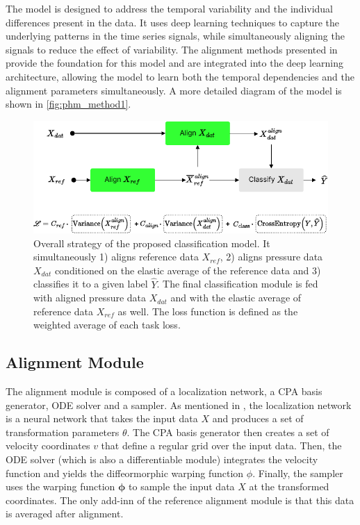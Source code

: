 The model is designed to address the temporal variability and the individual differences present in the data. It uses deep learning techniques to capture the underlying patterns in the time series signals, while simultaneously aligning the signals to reduce the effect of variability. The alignment methods presented in \cite{martinez2022closed} provide the foundation for this model and are integrated into the deep learning architecture, allowing the model to learn both the temporal dependencies and the alignment parameters simultaneously.
%
%
A more detailed diagram of the model is shown in \cref{fig:phm_method1}.
\begin{figure}[!htb]
    \begin{center}
    \centerline{\includegraphics[width=\linewidth]{figures/phm4.pdf}}
    \caption{Overall strategy of the proposed classification model. It simultaneously 1) aligns reference data $X_{ref}$, 2) aligns pressure data $X_{dat}$ conditioned on the elastic average of the reference data and 3) classifies it to a given label $\hat{Y}$. 
    The final classification module is fed with aligned pressure data $X_{dat}$ and with the elastic average of reference data $X_{ref}$ as well.
    The loss function is defined as the weighted average of each task loss.}
    \label{fig:phm_method2}
    \end{center}
\end{figure}



\subsection{Alignment Module}
The alignment module is composed of a localization network, a CPA basis generator, ODE solver and a sampler. As mentioned in \cite{martinez2022closed}, the localization network is a neural network that takes the input data $X$ and produces a set of transformation parameters $\theta$. The CPA basis generator then creates a set of velocity coordinates $v$ that define a regular grid over the input data. Then, the ODE solver (which is also a differentiable module) integrates the velocity function and yields the diffeormorphic warping function $\phi$. Finally, the sampler uses the warping function $\boldsymbol{\phi}$ to sample the input data $X$ at the transformed coordinates.
The only add-inn of the reference alignment module is that this data is averaged after alignment.


